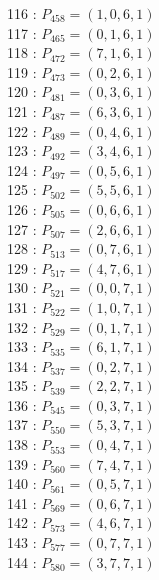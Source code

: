 \documentclass{article}
\begin{document}
{\begin{multicols}{3}
116 : $P_{458}=( 1, 0, 6, 1 )$\\
117 : $P_{465}=( 0, 1, 6, 1 )$\\
118 : $P_{472}=( 7, 1, 6, 1 )$\\
119 : $P_{473}=( 0, 2, 6, 1 )$\\
120 : $P_{481}=( 0, 3, 6, 1 )$\\
121 : $P_{487}=( 6, 3, 6, 1 )$\\
122 : $P_{489}=( 0, 4, 6, 1 )$\\
123 : $P_{492}=( 3, 4, 6, 1 )$\\
124 : $P_{497}=( 0, 5, 6, 1 )$\\
125 : $P_{502}=( 5, 5, 6, 1 )$\\
126 : $P_{505}=( 0, 6, 6, 1 )$\\
127 : $P_{507}=( 2, 6, 6, 1 )$\\
128 : $P_{513}=( 0, 7, 6, 1 )$\\
129 : $P_{517}=( 4, 7, 6, 1 )$\\
130 : $P_{521}=( 0, 0, 7, 1 )$\\
131 : $P_{522}=( 1, 0, 7, 1 )$\\
132 : $P_{529}=( 0, 1, 7, 1 )$\\
133 : $P_{535}=( 6, 1, 7, 1 )$\\
134 : $P_{537}=( 0, 2, 7, 1 )$\\
135 : $P_{539}=( 2, 2, 7, 1 )$\\
136 : $P_{545}=( 0, 3, 7, 1 )$\\
137 : $P_{550}=( 5, 3, 7, 1 )$\\
138 : $P_{553}=( 0, 4, 7, 1 )$\\
139 : $P_{560}=( 7, 4, 7, 1 )$\\
140 : $P_{561}=( 0, 5, 7, 1 )$\\
141 : $P_{569}=( 0, 6, 7, 1 )$\\
142 : $P_{573}=( 4, 6, 7, 1 )$\\
143 : $P_{577}=( 0, 7, 7, 1 )$\\
144 : $P_{580}=( 3, 7, 7, 1 )$\\
\end{multicols}


%


%


}%
\end{document}
